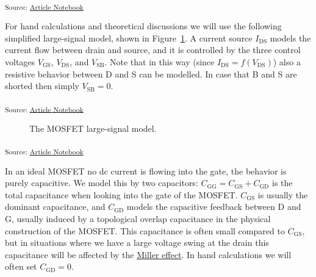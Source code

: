 \documentclass[
  a4paper,
  DIV=11,
  numbers=noendperiod]{scrartcl}
\begin{document}
\textsubscript{Source:
\href{https://iic-jku.github.io/analog-circuit-design/index.qmd.html}{Article
Notebook}}

For hand calculations and theoretical discussions we will use the
following simplified large-signal model, shown in
Figure~\ref{fig-mosfet-large-signal-model}. A current source
\(I_\mathrm{DS}\) models the current flow between drain and source, and
it is controlled by the three control voltages \(V_\mathrm{GS}\),
\(V_\mathrm{DS}\), and \(V_\mathrm{SB}\). Note that in this way (since
\(I_\mathrm{DS}= f(V_\mathrm{DS})\)) also a resistive behavior between D
and S can be modelled. In case that B and S are shorted then simply
\(V_\mathrm{SB} = 0\).

\textsubscript{Source:
\href{https://iic-jku.github.io/analog-circuit-design/index.qmd.html}{Article
Notebook}}

\begin{figure}[H]


\caption{\label{fig-mosfet-large-signal-model}The MOSFET large-signal
model.}

\end{figure}%

\textsubscript{Source:
\href{https://iic-jku.github.io/analog-circuit-design/index.qmd.html}{Article
Notebook}}

In an ideal MOSFET no dc current is flowing into the gate, the behavior
is purely capacitive. We model this by two capacitors:
\(C_\mathrm{GG}= C_\mathrm{GS}+ C_\mathrm{GD}\) is the total capacitance
when looking into the gate of the MOSFET. \(C_\mathrm{GS}\) is usually
the dominant capacitance, and \(C_\mathrm{GD}\) models the capacitive
feedback between D and G, usually induced by a topological overlap
capacitance in the physical construction of the MOSFET. This capacitance
is often small compared to \(C_\mathrm{GS}\), but in situations where we
have a large voltage swing at the drain this capacitance will be
affected by the
\href{https://en.wikipedia.org/wiki/Miller_effect}{Miller effect}. In
hand calculations we will often set \(C_\mathrm{GD}= 0\).
\end{document}
